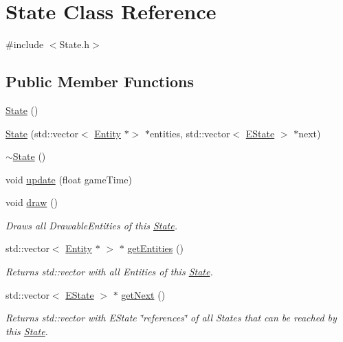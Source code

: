 \hypertarget{class_state}{}\section{State Class Reference}
\label{class_state}


{\ttfamily \#include $<$State.\+h$>$}

\subsection*{Public Member Functions}
\begin{DoxyCompactItemize}
\item 
\mbox{\hyperlink{class_state_ab91bb1dd5aa6260ab2a456581daf9ec2}{State}} ()
\item 
\mbox{\hyperlink{class_state_a79094488d03d0299758e83eda0ae3372}{State}} (std\+::vector$<$ \mbox{\hyperlink{class_entity}{Entity}} $\ast$$>$ $\ast$entities, std\+::vector$<$ \mbox{\hyperlink{_finite_state_machine_8h_af5cd382b45a5ef41d63b95e55fbeca95}{E\+State}} $>$ $\ast$next)
\item 
\mbox{\hyperlink{class_state_afab438d92b90dc18d194dbd9c9c8bab3}{$\sim$\+State}} ()
\item 
void \mbox{\hyperlink{class_state_adfaddb5aedfeca338af219798b37ff60}{update}} (float game\+Time)
\item 
void \mbox{\hyperlink{class_state_a548bbd450e95030e0582013466d71029}{draw}} ()
\begin{DoxyCompactList}\small\item\em Draws all Drawable\+Entities of this \mbox{\hyperlink{class_state}{State}}. \end{DoxyCompactList}\item 
std\+::vector$<$ \mbox{\hyperlink{class_entity}{Entity}} $\ast$ $>$ $\ast$ \mbox{\hyperlink{class_state_aeb13f8cbb9aaac05ce2f48826ac4080e}{get\+Entities}} ()
\begin{DoxyCompactList}\small\item\em Returns std\+::vector with all Entities of this \mbox{\hyperlink{class_state}{State}}. \end{DoxyCompactList}\item 
std\+::vector$<$ \mbox{\hyperlink{_finite_state_machine_8h_af5cd382b45a5ef41d63b95e55fbeca95}{E\+State}} $>$ $\ast$ \mbox{\hyperlink{class_state_a38819e230878dbaf8ef24014c539fe2c}{get\+Next}} ()
\begin{DoxyCompactList}\small\item\em Returns std\+::vector with E\+State \char`\"{}references\char`\"{} of all States that can be reached by this \mbox{\hyperlink{class_state}{State}}. \end{DoxyCompactList}\end{DoxyCompactItemize}


